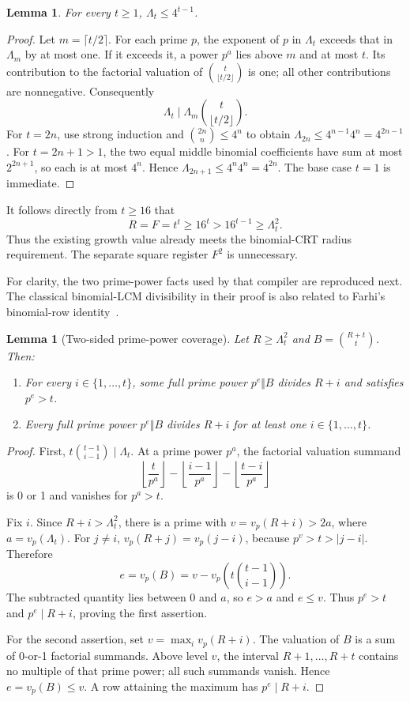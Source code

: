 \documentclass[11pt]{article}
\newtheorem{lemma}[theorem]{Lemma}
\begin{document}
\begin{lemma}\label{lem:lcm}
For every $t\ge1$, $\Lambda_t\le4^{t-1}$.
\end{lemma}
\begin{proof}
Let $m=\lceil t/2\rceil$. For each prime $p$, the exponent of $p$ in
$\Lambda_t$ exceeds that in $\Lambda_m$ by at most one. If it exceeds
it, a power $p^a$ lies above $m$ and at most $t$. Its contribution to
the factorial valuation of $\binom{t}{\lfloor t/2\rfloor}$ is one;
all other contributions are nonnegative. Consequently
\[
 \Lambda_t\mid\Lambda_m\binom{t}{\lfloor t/2\rfloor}.
\]
For $t=2n$, use strong induction and $\binom{2n}{n}\le4^n$ to obtain
$\Lambda_{2n}\le4^{n-1}4^n=4^{2n-1}$.
For $t=2n+1>1$, the two equal middle binomial coefficients have sum at
most $2^{2n+1}$, so each is at most $4^n$. Hence
$\Lambda_{2n+1}\le4^n4^n=4^{2n}$. The base case $t=1$ is immediate.
\end{proof}

It follows directly from $t\ge16$ that
\begin{equation}\label{eq:radius}
 R=F=t^t\ge16^t>16^{t-1}\ge\Lambda_t^2.
\end{equation}
Thus the existing growth value already meets the binomial-CRT radius
requirement. The separate square register $F^2$ is unnecessary.

For clarity, the two prime-power facts used by that compiler are reproduced
next. The classical binomial-LCM divisibility in their proof is also
related to Farhi's binomial-row identity~\cite{farhi}.

\begin{lemma}[Two-sided prime-power coverage]\label{lem:coverage}
Let $R\ge\Lambda_t^2$ and $B=\binom{R+t}{t}$. Then:
\begin{enumerate}
\item For every $i\in\{1,\ldots,t\}$, some full prime power
      $p^e\Vert B$ divides $R+i$ and satisfies $p^e>t$.
\item Every full prime power $p^e\Vert B$ divides $R+i$ for at least
      one $i\in\{1,\ldots,t\}$.
\end{enumerate}
\end{lemma}
\begin{proof}
First, $t\binom{t-1}{i-1}\mid\Lambda_t$. At a prime power $p^a$, the
factorial valuation summand
\[
 \left\lfloor\frac{t}{p^a}\right\rfloor
 -\left\lfloor\frac{i-1}{p^a}\right\rfloor
 -\left\lfloor\frac{t-i}{p^a}\right\rfloor
\]
is 0 or 1 and vanishes for $p^a>t$.

Fix $i$. Since $R+i>\Lambda_t^2$, there is a prime with
$v=v_p(R+i)>2a$, where $a=v_p(\Lambda_t)$. For $j\ne i$,
$v_p(R+j)=v_p(j-i)$, because $p^v>t>|j-i|$.
Therefore
\[
 e=v_p(B)=v-v_p\!\left(t\binom{t-1}{i-1}\right).
\]
The subtracted quantity lies between 0 and $a$, so $e>a$ and $e\le v$.
Thus $p^e>t$ and $p^e\mid R+i$, proving the first assertion.

For the second assertion, set $v=\max_i v_p(R+i)$. The valuation of
$B$ is a sum of 0-or-1 factorial summands. Above level $v$, the interval
$R+1,\ldots,R+t$ contains no multiple of that prime power; all such
summands vanish. Hence $e=v_p(B)\le v$. A row attaining the maximum
has $p^e\mid R+i$.
\end{proof}
\end{document}
